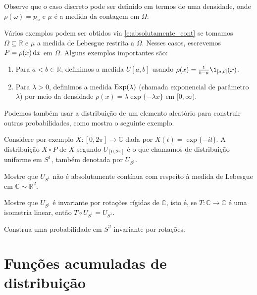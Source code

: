 Observe que o caso discreto pode ser definido em termos de uma densidade, onde $\rho(\omega) = p_\omega$ e $\mu$ é a medida da contagem em $\Omega$.

\begin{example}
  Vários exemplos podem ser obtidos via \eqref{e:absolutamente_cont} se tomamos $\Omega \subseteq \mathbb{R}$ e $\mu$ a medida de Lebesgue restrita a $\Omega$.
  Nesses casos, escrevemos $P = \rho(x) \mathop{}\!\mathrm{d} x$ em $\Omega$.
  Alguns exemplos importantes são:
  \begin{enumerate}[\quad a)]
  \item Para $a < b \in \mathbb{R}$, definimos a medida $U[a,b]$  usando $\rho(x) = \tfrac{1}{b-a}\1_{[a,b]}(x)$.
  \item Para $\lambda > 0$, definimos a medida $\operatorname{Exp}(\lambda)$  (chamada exponencial de parâmetro $\lambda$) por meio da densidade $\rho(x) = \lambda \exp\{-\lambda x\}$ em $[0,\infty)$.
  \end{enumerate}
\end{example}

Podemos também usar a distribuição de um elemento aleatório para construir outras probabilidades, como mostra o seguinte exemplo.

\begin{example}
  Considere por exemplo $X:[0,2\pi] \to \mathbb{C}$ dada por $X(t) = \exp\{-i t\}$.
  A distribuição $X \circ P$ de $X$ segundo $U_{[0,2\pi]}$ é o que chamamos de distribuição uniforme em $S^1$, também denotada por $U_{S^1}$.
\end{example}

\begin{exercise}
  Mostre que $U_{S^1}$ não é absolutamente contínua com respeito à medida de Lebesgue em $\mathbb{C} \sim \mathbb{R}^2$.
\end{exercise}

\begin{exercise}
  Mostre que $U_{S^1}$ é invariante por rotações rígidas de $\mathbb{C}$, isto é, se $T:\mathbb{C} \to \mathbb{C}$ é uma isometria linear, então $T \circ U_{S^1} = U_{S^1}$.
\end{exercise}

\begin{exercise}
  Construa uma probabilidade em $S^2$ invariante por rotações.
\end{exercise}

\section{Funções acumuladas de distribuição}

